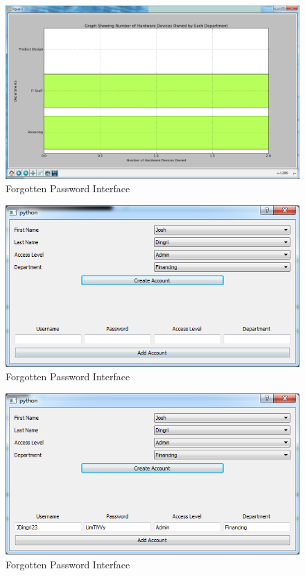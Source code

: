 \begin{figure}[H]
    \includegraphics[width=\textwidth]{./Testing/Images/GraphButton.png}
    \caption{Forgotten Password Interface} \label{fig:GraphButton}
\end{figure}

\begin{figure}[H]
    \includegraphics[width=\textwidth]{./Testing/Images/AddAccountsButton.png}
    \caption{Forgotten Password Interface} \label{fig:AddAccountsButton}
\end{figure}

\begin{figure}[H]
    \includegraphics[width=\textwidth]{./Testing/Images/AddAccountDetails.png}
    \caption{Forgotten Password Interface} \label{fig:AddAccountDetails}
\end{figure}

